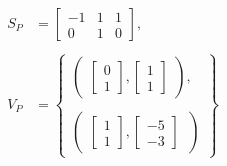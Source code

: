 \begin{align*}
    S_P &= \begin{bmatrix}
        -1 & 1 & 1 \\
        0 & 1 & 0
    \end{bmatrix}, \ \\ \\
    V_P &= \begin{Bmatrix}
        \begin{pmatrix}
              \begin{bmatrix}
                    0 \\
                    1
               \end{bmatrix},
               \begin{bmatrix}
                     1 \\
                     1
               \end{bmatrix}
        \end{pmatrix}, \\ \\
        \begin{pmatrix}
               \begin{bmatrix}
                    1 \\
                    1
               \end{bmatrix},
               \begin{bmatrix}
                    -5 \\
                    -3
              \end{bmatrix}
        \ \end{pmatrix}
    \end{Bmatrix}
\end{align*}
